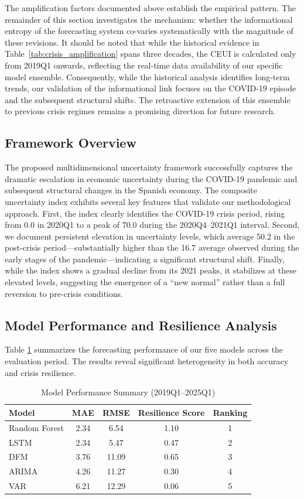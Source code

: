 \documentclass[12pt,a4paper]{article}
\theoremstyle{remark}
\begin{document}
The amplification factors documented above establish the empirical pattern. The remainder of this section investigates the mechanism: whether the informational entropy of the forecasting system co-varies systematically with the magnitude of these revisions. It should be noted that while the historical evidence in Table~\ref{tab:crisis_amplification} spans three decades, the CEUI is calculated only from 2019Q1 onwards, reflecting the real-time data availability of our specific model ensemble. Consequently, while the historical analysis identifies long-term trends, our validation of the informational link focuses on the COVID-19 episode and the subsequent structural shifts. The retroactive extension of this ensemble to previous crisis regimes remains a promising direction for future research.

\subsection{Framework Overview}

The proposed multidimensional uncertainty framework successfully captures the dramatic escalation in economic uncertainty during the COVID-19 pandemic and subsequent structural changes in the Spanish economy. The composite uncertainty index exhibits several key features that validate our methodological approach. First, the index clearly identifies the COVID-19 crisis period, rising from 0.0 in 2020Q1 to a peak of 70.0 during the 2020Q4--2021Q1 interval. Second, we document persistent elevation in uncertainty levels, which average 50.2 in the post-crisis period---substantially higher than the 16.7 average observed during the early stages of the pandemic---indicating a significant structural shift. Finally, while the index shows a gradual decline from its 2021 peaks, it stabilizes at these elevated levels, suggesting the emergence of a ``new normal'' rather than a full reversion to pre-crisis conditions.

\subsection{Model Performance and Resilience Analysis}

Table \ref{tab:model_performance} summarizes the forecasting performance of our five models across the evaluation period. The results reveal significant heterogeneity in both accuracy and crisis resilience.

\begin{table}[t]
\centering
\caption{Model Performance Summary (2019Q1--2025Q1)}
\label{tab:model_performance}
\begin{tabular}{lcccc}
\toprule
Model & MAE & RMSE & Resilience Score & Ranking \\
\midrule
Random Forest & 2.34 & 6.54 & 1.10 & 1 \\
LSTM & 2.34 & 5.47 & 0.47 & 2 \\
DFM & 3.76 & 11.09 & 0.65 & 3 \\
ARIMA & 4.26 & 11.27 & 0.30 & 4 \\
VAR & 6.21 & 12.29 & 0.06 & 5 \\
\bottomrule
\end{tabular}
\end{table}
\end{document}

